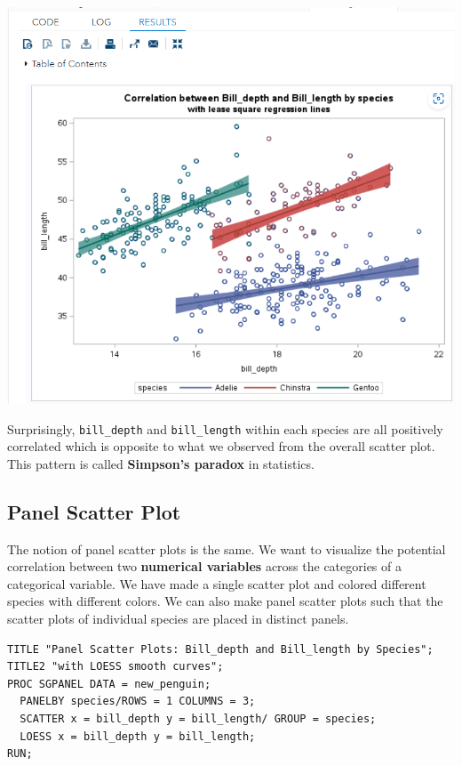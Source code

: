 \documentclass[
]{book}
\begin{document}
\begin{center}\includegraphics[width=1\linewidth]{img06/w06-IndividualCorrBySpecies} \end{center}

Surprisingly, \texttt{bill\_depth} and \texttt{bill\_length} within each species are all positively correlated which is opposite to what we observed from the overall scatter plot. This pattern is called \textbf{Simpson's paradox} in statistics.

\hypertarget{panel-scatter-plot}{%
\subsection{Panel Scatter Plot}\label{panel-scatter-plot}}

The notion of panel scatter plots is the same. We want to visualize the potential correlation between two \textbf{numerical variables} across the categories of a categorical variable. We have made a single scatter plot and colored different species with different colors. We can also make panel scatter plots such that the scatter plots of individual species are placed in distinct panels.

\begin{verbatim}
TITLE "Panel Scatter Plots: Bill_depth and Bill_length by Species";
TITLE2 "with LOESS smooth curves";
PROC SGPANEL DATA = new_penguin;
  PANELBY species/ROWS = 1 COLUMNS = 3;
  SCATTER x = bill_depth y = bill_length/ GROUP = species;
  LOESS x = bill_depth y = bill_length; 
RUN;
\end{verbatim}
\end{document}
